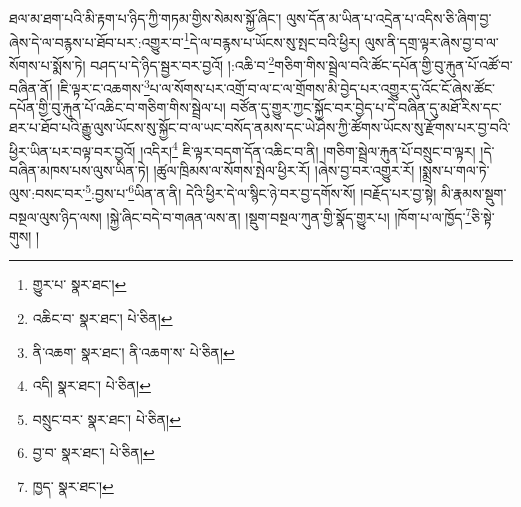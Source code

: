 ཐལ་མ་ཐག་པའི་མི་རྟག་པ་ཉིད་ཀྱི་གཏམ་གྱིས་སེམས་སྐྱོ་ཞིང་། ལུས་དོན་མ་ཡིན་པ་འདྲེན་པ་འདིས་ཅི་ཞིག་བྱ་ཞེས་དེ་ལ་བརྙས་པ་ཐོབ་པར་:འགྱུར་བ་\footnote{གྱུར་པ་  སྣར་ཐང་། }དེ་ལ་བརྙས་པ་ཡོངས་སུ་སྤང་བའི་ཕྱིར། ལུས་ནི་དགྲ་ལྟར་ཞེས་བྱ་བ་ལ་སོགས་པ་སྨོས་ཏེ། བཤད་པ་དེ་ཉིད་སྦྱར་བར་བྱའོ། །:འཆི་བ་\footnote{འཆིང་བ་  སྣར་ཐང་།  པེ་ཅིན། }གཅིག་གིས་སྦྲེལ་བའི་ཚོང་དཔོན་གྱི་བུ་རྐུན་པོ་འཚོ་བ་བཞིན་ནོ། །ཇི་ལྟར་ང་འཆགས་\footnote{ནི་འཆག་  སྣར་ཐང་། ནི་འཆག་ས་  པེ་ཅིན། }པ་ལ་སོགས་པར་འགྲོ་བ་ལ་ང་ལ་གྲོགས་མི་བྱེད་པར་འགྱུར་དུ་འོང་ངོ་ཞེས་ཚོང་དཔོན་གྱི་བུ་རྐུན་པོ་འཆིང་བ་གཅིག་གིས་སྦྲེལ་པ། བཙོན་དུ་གྱུར་ཀྱང་སྐྱོང་བར་བྱེད་པ་དེ་བཞིན་དུ་མཐོ་རིས་དང་ཐར་པ་ཐོབ་པའི་རྒྱུ་ལུས་ཡོངས་སུ་སྐྱོང་བ་ལ་ཡང་བསོད་ནམས་དང་ཡེ་ཤེས་ཀྱི་ཚོགས་ཡོངས་སུ་རྫོགས་པར་བྱ་བའི་ཕྱིར་ཡིན་པར་བལྟ་བར་བྱའོ། །འདིར།\footnote{འདི།  སྣར་ཐང་།  པེ་ཅིན། } ཇི་ལྟར་བདག་དོན་འཆིང་བ་ནི། །གཅིག་སྦྲེལ་རྐུན་པོ་བསྲུང་བ་ལྟར། །དེ་བཞིན་མཁས་པས་ལུས་ཡིན་ཏེ། །ཚུལ་ཁྲིམས་ལ་སོགས་སྤེལ་ཕྱིར་རོ། །ཞེས་བྱ་བར་འགྱུར་རོ། །སྨྲས་པ་གལ་ཏེ་ལུས་:བསང་བར་\footnote{བསྲུང་བར་  སྣར་ཐང་།  པེ་ཅིན། }:བྱས་པ་\footnote{བྱ་བ་  སྣར་ཐང་།  པེ་ཅིན། }ཡིན་ན་ནི། དེའི་ཕྱིར་དེ་ལ་སྙིང་ཉེ་བར་བྱ་དགོས་སོ། །བརྗོད་པར་བྱ་སྟེ། མི་རྣམས་སྡུག་བསྔལ་ལུས་ཉིད་ལས། །སྐྱེ་ཞིང་བདེ་བ་གཞན་ལས་ན། །སྡུག་བསྔལ་ཀུན་གྱི་སྣོད་གྱུར་པ། །ཁོག་པ་ལ་ཁྱོད་\footnote{ཁྱད་  སྣར་ཐང་། }ཅི་སྟེ་གུས། །
